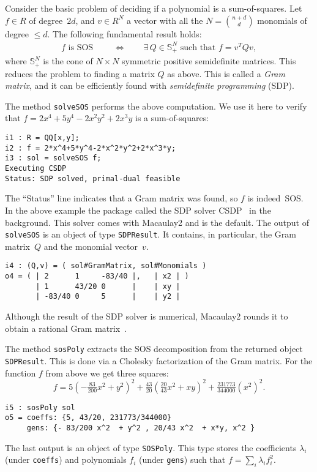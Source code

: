 \documentclass[11pt]{amsart}
\theoremstyle{plain}%
\theoremstyle{definition}
\theoremstyle{remark}
\newcommand{\Mac}{Macaulay2\xspace}
\begin{document}
Consider the basic problem of deciding if a polynomial is a sum-of-squares.
Let $f \!\in\! R$ of degree~$2d$,
and $v \!\in\! R^N$ a vector with all the $N \!=\! \binom{n+d}{d}$ monomials of degree $\leq\!d$.
The following fundamental result holds:
\begin{align*}
  f \text{ is SOS } 
  \qquad\iff\qquad
  \exists\, Q\in \mathbb{S}_+^N \text{ such that } f = v^T Q v,
\end{align*}
where $\mathbb{S}_+^N$ is the cone of $N{\times} N$ symmetric positive semidefinite matrices.
This reduces the problem to finding a matrix $Q$ as above. 
This is called a \emph{Gram matrix}, and it can be efficiently found with \emph{semidefinite programming} (SDP).

The method \verb|solveSOS| performs the above computation.
We use it here to verify that $f = 2 x^4 {+} 5 y^4 {-} 2 x^2 y^2 {+} 2 x^3 y$ is a sum-of-squares:
{\small
\begin{verbatim}
i1 : R = QQ[x,y];
i2 : f = 2*x^4+5*y^4-2*x^2*y^2+2*x^3*y;
i3 : sol = solveSOS f;
Executing CSDP
Status: SDP solved, primal-dual feasible
\end{verbatim}
}
\noindent
The ``Status'' line indicates that a Gram matrix was found, so $f$ is indeed~SOS.
In the above example the package called the SDP solver CSDP~\cite{borchers1999csdp} in the background.
This solver comes with \Mac and is the default.
The output of \verb|solveSOS| is an object of type \verb|SDPResult|.
It contains, in particular, the Gram matrix~$Q$ and the monomial vector~$v$.
{\small
\begin{verbatim}
i4 : (Q,v) = ( sol#GramMatrix, sol#Monomials )
o4 = ( | 2      1     -83/40 |,   | x2 | )
       | 1      43/20 0      |    | xy | 
       | -83/40 0     5      |    | y2 | 
\end{verbatim}
}
\noindent
Although the result of the SDP solver is numerical, Macaulay2 rounds it to obtain a rational Gram matrix~\cite{peyrl2008computing}.

The method \verb|sosPoly| extracts the SOS decomposition from the returned object \verb|SDPResult|.
This is done via a Cholesky factorization of the Gram matrix.
For the function $f$ from above we get three squares:
\[
  f = 5(-\tfrac{83}{200} x^{2}+y^{2})^{2} + \tfrac{43}{20}
  (\tfrac{20}{43}x^{2} + xy)^{2} + \tfrac{231773}{344000} (x^{2})^{2}.
\]
{\small
\begin{verbatim}
i5 : sosPoly sol
o5 = coeffs: {5, 43/20, 231773/344000}
     gens: {- 83/200 x^2  + y^2 , 20/43 x^2  + x*y, x^2 }
\end{verbatim}
}
\noindent
The last output is an object of type \verb|SOSPoly|.
This type stores the coefficients $\lambda_{i}$ (under \verb|coeffs|) and polynomials $f_{i}$ (under \verb|gens|) such that $f = \sum_{i}\lambda_{i}f_{i}^{2}$.
\end{document}
